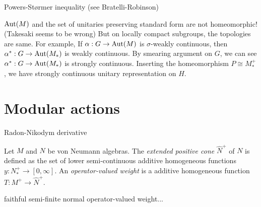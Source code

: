 \documentclass{../../large}
\begin{document}
\begin{prb}
\end{prb}

\begin{prb}
\end{prb}

\begin{prb}
Powers-St\o rmer inequality (see Bratelli-Robinson)

$\operatorname{Aut}(M)$ and the set of unitaries preserving standard form are not homeomorphic! (Takesaki seems to be wrong)
But on locally compact subgroups, the topologies are same.
For example,
If $\alpha:G\to\operatorname{Aut}(M)$ is $\sigma$-weakly continuous, then $\alpha^*:G\to\operatorname{Aut}(M_*)$ is weakly continuous.
By smearing argument on $G$, we can see $\alpha^*:G\to\operatorname{Aut}(M_*)$ is strongly continuous.
Inserting the homeomorphism $P\cong M_*^+$, we have strongly continuous unitary representation on $H$.
\end{prb}





\section{Modular actions}

\begin{prb}
\end{prb}

\begin{prb}
\end{prb}


\begin{prb}
Radon-Nikodym derivative
\end{prb}



\begin{prb}
\end{prb}

\begin{prb}
Let $M$ and $N$ be von Neumann algebras.
The \emph{extended positive cone} $\hat N^+$ of $N$ is defined as the set of lower semi-continuous additive homogeneous functions $y:N_*^+\to[0,\infty]$.
An \emph{operator-valued weight} is a additive homogeneous function $T:M^+\to\hat N^+$.

faithful semi-finite normal operator-valued weight...
\end{prb}
\end{document}
